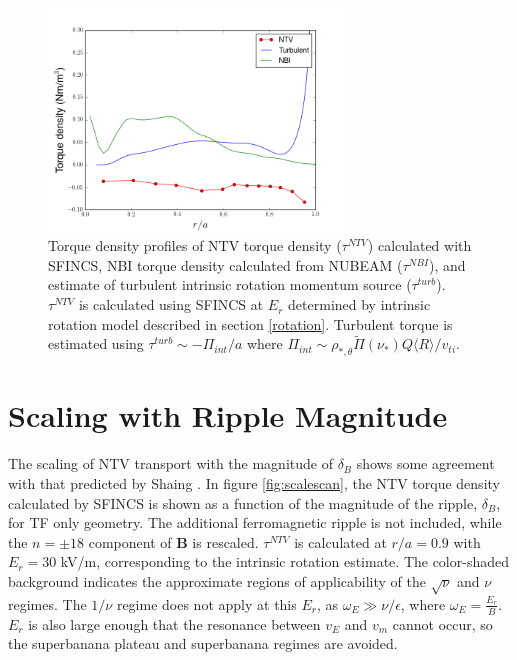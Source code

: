 \documentclass{article}
\numberwithin{figure}{section}
\numberwithin{equation}{section}
\begin{document}
\begin{figure}[h!]
\centering
\includegraphics[width=0.7\textwidth]{AllTorquePlot.png}
\caption{\label{fig:alltorque} Torque density profiles of NTV torque density ($\tau^{NTV}$) calculated with SFINCS, NBI torque density calculated from NUBEAM ($\tau^{NBI}$), and estimate of turbulent intrinsic rotation momentum source ($\tau^{turb}$). $\tau^{NTV}$ is calculated using SFINCS at $E_r$ determined by intrinsic rotation model described in section \ref{rotation}. Turbulent torque is estimated using $\tau^{turb} \sim -\Pi_{int}/a$ where $\Pi_{int} \sim \rho_{*, \theta} \widetilde{\Pi}(\nu_*) Q \langle R \rangle/v_{ti}$.}
\end{figure}

\FloatBarrier

\section{Scaling with Ripple Magnitude}\label{scaling}
The scaling of NTV transport with the magnitude of $\delta_B$ shows some agreement with that predicted by Shaing \cite{Shaing2008}. In figure \ref{fig:scalescan}, the NTV torque density calculated by SFINCS is shown as a function of the magnitude of the ripple, $\delta_B$, for TF only geometry. The additional ferromagnetic ripple is not included, while the $n= \pm18$ component of $\bm{B}$ is rescaled. $\tau^{NTV}$ is calculated at $r/a = 0.9$ with $E_r = 30$ kV/m, corresponding to the intrinsic rotation estimate. The color-shaded background indicates the approximate regions of applicability of the $\sqrt{\nu}$ and $\nu$ regimes. The $1/\nu$ regime does not apply at this $E_r$, as $\omega_E \gg \nu/\epsilon$, where $\omega_E = \frac{E_r}{B}$. $E_r$ is also large enough that the resonance between $v_{E}$ and $v_{m}$ cannot occur, so the superbanana plateau and superbanana regimes are avoided. 
\end{document}
